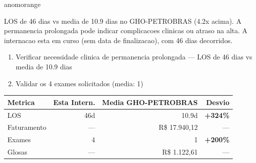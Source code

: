 \documentclass[a4paper,10pt]{article}
\begin{document}
\begin{anomalycard}[Internacao 164668 | GHO-PETROBRAS | ALTO (z=4.20)]{anomorange}
\vspace{2pt}\begin{tcolorbox}[colback=severityred!20,colframe=anomorange,title={\textbf{Interpretacao de Negocio}},fonttitle=\bfseries\small,left=4pt,right=4pt,top=3pt,bottom=3pt]
{\small LOS de 46 dias vs media de 10.9 dias no GHO-PETROBRAS (4.2x acima). A permanencia prolongada pode indicar complicacoes clinicas ou atraso na alta. A internacao esta em curso (sem data de finalizacao), com 46 dias decorridos.}
\end{tcolorbox}
\begin{tcolorbox}[colback=severityyellow!30,colframe=anomorange,title={\textbf{Recomendacoes Especificas}},fonttitle=\bfseries\small,left=4pt,right=4pt,top=3pt,bottom=3pt]
\begin{enumerate}[nosep,leftmargin=16pt]
\item {\small Verificar necessidade clinica de permanencia prolongada --- LOS de 46 dias vs media de 10.9 dias}
\item {\small Validar os 4 exames solicitados (media: 1)}
\end{enumerate}
\end{tcolorbox}
\begin{center}\begin{tabular}{l r r r}\toprule\textbf{Metrica} & \textbf{Esta Intern.} & \textbf{Media GHO-PETROBRAS} & \textbf{Desvio} \\\midrule
LOS & 46d & 10.9d & \textcolor{anomred}{\textbf{+324\%}} \\
Faturamento & --- & R\$ 17.940,12 & --- \\
Exames & 4 & 1 & \textcolor{anomred}{\textbf{+200\%}} \\
Glosas & --- & R\$ 1.122,61 & --- \\
\bottomrule\end{tabular}\end{center}


\end{anomalycard}
\end{document}
